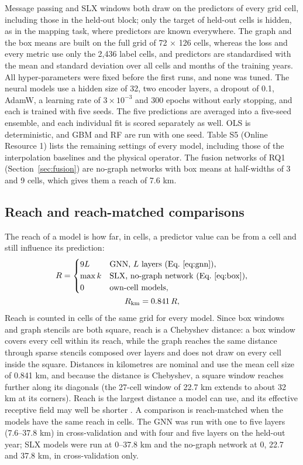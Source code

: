 \documentclass[pdflatex,sn-basic]{sn-jnl}
\begin{document}
Message passing and SLX windows both draw on the predictors of every grid cell, including those in the held-out block; only the target of held-out cells is hidden, as in the mapping task, where predictors are known everywhere. The graph and the box means are built on the full grid of 72 × 126 cells, whereas the loss and every metric use only the 2,436 label cells, and predictors are standardised with the mean and standard deviation over all cells and months of the training years. All hyper-parameters were fixed before the first runs, and none was tuned. The neural models use a hidden size of 32, two encoder layers, a dropout of 0.1, AdamW, a learning rate of $3 \times 10^{-3}$ and 300 epochs without early stopping, and each is trained with five seeds. The five predictions are averaged into a five-seed ensemble, and each individual fit is scored separately as well. OLS is deterministic, and GBM and RF are run with one seed. Table S5 (Online Resource 1) lists the remaining settings of every model, including those of the interpolation baselines and the physical operator. The fusion networks of RQ1 (Section~\ref{sec:fusion}) are no-graph networks with box means at half-widths of 3 and 9 cells, which gives them a reach of 7.6 km.

\subsection{Reach and reach-matched comparisons}\label{sec:reach}

The reach of a model is how far, in cells, a predictor value can be from a cell and still influence its prediction:
\begin{equation}
\begin{gathered}
R = \begin{cases} 9L & \text{GNN, } L \text{ layers (Eq.~\ref{eq:gnn})},\\ \max k & \text{SLX, no-graph network (Eq.~\ref{eq:box})},\\ 0 & \text{own-cell models,} \end{cases} \\
R_{\mathrm{km}} = 0.841\,R ,
\end{gathered} \label{eq:reach}
\end{equation}
Reach is counted in cells of the same grid for every model. Since box windows and graph stencils are both square, reach is a Chebyshev distance: a box window covers every cell within its reach, while the graph reaches the same distance through sparse stencils composed over layers and does not draw on every cell inside the square. Distances in kilometres are nominal and use the mean cell size of 0.841 km, and because the distance is Chebyshev, a square window reaches further along its diagonals (the 27-cell window of 22.7 km extends to about 32 km at its corners). Reach is the largest distance a model can use, and its effective receptive field may well be shorter \citep{luo2016}. A comparison is reach-matched when the models have the same reach in cells. The GNN was run with one to five layers (7.6--37.8 km) in cross-validation and with four and five layers on the held-out year; SLX models were run at 0--37.8 km and the no-graph network at 0, 22.7 and 37.8 km, in cross-validation only.
\end{document}
